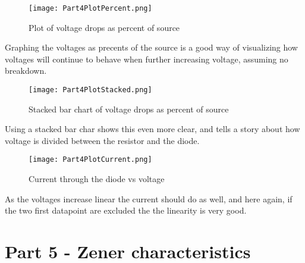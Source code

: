 \documentclass{article}
\begin{document}

\begin{figure}[h]
\centering
\texttt{[image: Part4PlotPercent.png]}
\caption{Plot of voltage drops as percent of source}
\label{fig:part4percent}
\end{figure}
Graphing the voltages as precents of the source is a good way of visualizing how voltages will continue to behave when further increasing voltage, assuming no breakdown.
\clearpage


\begin{figure}[h]
\centering
\texttt{[image: Part4PlotStacked.png]}
\caption{Stacked bar chart of voltage drops as percent of source}
\label{fig:part4stacked}
\end{figure}
Using a stacked bar char shows this even more clear, and tells a story about how voltage is divided between the resistor and the diode.
\clearpage


\begin{figure}[h]
\centering
\texttt{[image: Part4PlotCurrent.png]}
\caption{Current through the diode vs voltage}
\label{fig:part4current}
\end{figure}
As the voltages increase linear the current should do as well, and here again, if the two first datapoint are excluded the the linearity is very good.


\section{Part 5 - Zener characteristics}

\end{document}
